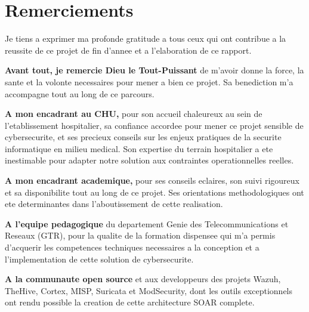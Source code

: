 \chapter*{Remerciements}

\vspace{1cm}

Je tiens a exprimer ma profonde gratitude a tous ceux qui ont contribue a la reussite de ce projet de fin d'annee et a l'elaboration de ce rapport.

\vspace{0.5cm}

\textbf{Avant tout, je remercie Dieu le Tout-Puissant} de m'avoir donne la force, la sante et la volonte necessaires pour mener a bien ce projet. Sa benediction m'a accompagne tout au long de ce parcours.

\vspace{0.5cm}

\textbf{A mon encadrant au CHU,} pour son accueil chaleureux au sein de l'etablissement hospitalier, sa confiance accordee pour mener ce projet sensible de cybersecurite, et ses precieux conseils sur les enjeux pratiques de la securite informatique en milieu medical. Son expertise du terrain hospitalier a ete inestimable pour adapter notre solution aux contraintes operationnelles reelles.

\vspace{0.5cm}

\textbf{A mon encadrant academique,} pour ses conseils eclaires, son suivi rigoureux et sa disponibilite tout au long de ce projet. Ses orientations methodologiques ont ete determinantes dans l'aboutissement de cette realisation.

\vspace{0.5cm}

\textbf{A l'equipe pedagogique} du departement Genie des Telecommunications et Reseaux (GTR), pour la qualite de la formation dispensee qui m'a permis d'acquerir les competences techniques necessaires a la conception et a l'implementation de cette solution de cybersecurite.

\vspace{0.5cm}

\textbf{A la communaute open source} et aux developpeurs des projets Wazuh, TheHive, Cortex, MISP, Suricata et ModSecurity, dont les outils exceptionnels ont rendu possible la creation de cette architecture SOAR complete.

\vspace{0.5cm}

